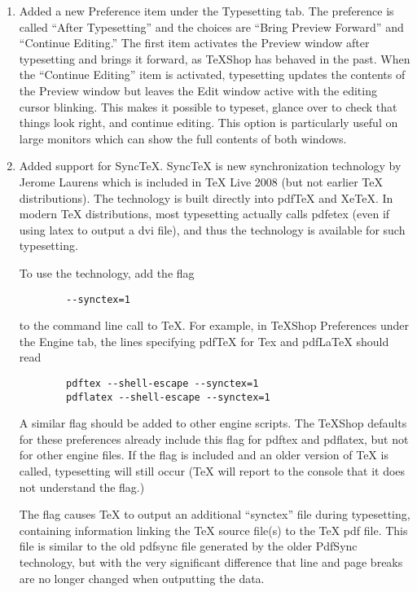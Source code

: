 \documentclass[11pt, oneside]{amsart}
\begin{document}
\begin{enumerate}
\item Added a new Preference item under the Typesetting tab. The preference is called ``After Typesetting'' and the choices are ``Bring Preview Forward'' and ``Continue Editing.'' The first item activates the Preview window after typesetting and brings it forward, as TeXShop has behaved in the past. When the ``Continue Editing'' item is activated, typesetting updates the contents of the Preview window but leaves the Edit window active with the editing cursor blinking. This makes it possible to typeset, glance over to check that things look right, and continue editing. This option is particularly useful on large monitors which can show the full contents of both windows.

\item Added support for SyncTeX. SyncTeX is new synchronization technology by Jerome Laurens which is included in TeX Live 2008 (but not earlier TeX distributions). The technology is built directly into pdfTeX and XeTeX. In modern TeX distributions, most typesetting actually calls pdfetex (even if using latex to output a dvi file), and thus the technology is available for such typesetting.

To use the technology, add the flag
\begin{verbatim}
        --synctex=1
\end{verbatim}

to the command line call to TeX. For example, in TeXShop Preferences under the Engine tab, the lines specifying pdfTeX for Tex and pdfLaTeX should read

\begin{verbatim}
        pdftex --shell-escape --synctex=1
        pdflatex --shell-escape --synctex=1
\end{verbatim}
A similar flag should be added to other engine scripts. The TeXShop defaults for these preferences already include this flag for pdftex and pdflatex, but not for other engine files. If the flag is included and an older version of TeX is called, typesetting will still occur (TeX will report to the console that it does not understand the flag.)

The flag causes TeX to output an additional ``synctex'' file during typesetting, containing information linking the TeX source file(s) to the TeX pdf file. This file is similar to the old pdfsync file generated by the older PdfSync technology, but with the very significant difference that line and page breaks are no longer changed when outputting the data.


\end{enumerate}
\end{document}
